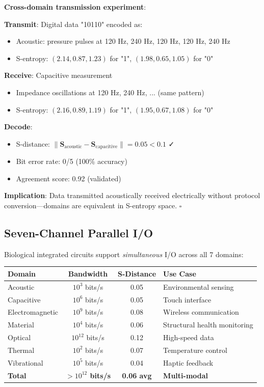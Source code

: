 \documentclass[11pt,a4paper]{article}
\begin{document}
\textbf{Cross-domain transmission experiment}:

\textbf{Transmit}: Digital data "10110" encoded as:
\begin{itemize}
\item Acoustic: pressure pulses at 120 Hz, 240 Hz, 120 Hz, 120 Hz, 240 Hz
\item S-entropy: $(2.14, 0.87, 1.23)$ for "1", $(1.98, 0.65, 1.05)$ for "0"
\end{itemize}

\textbf{Receive}: Capacitive measurement
\begin{itemize}
\item Impedance oscillations at 120 Hz, 240 Hz, ... (same pattern)
\item S-entropy: $(2.16, 0.89, 1.19)$ for "1", $(1.95, 0.67, 1.08)$ for "0"
\end{itemize}

\textbf{Decode}:
\begin{itemize}
\item S-distance: $\|\mathbf{S}_{\text{acoustic}} - \mathbf{S}_{\text{capacitive}}\| = 0.05 < 0.1$ ✓
\item Bit error rate: 0/5 (100\% accuracy)
\item Agreement score: 0.92 (validated)
\end{itemize}

\textbf{Implication}: Data transmitted acoustically received electrically without protocol conversion—domains are equivalent in S-entropy space. $\square$

\subsection{Seven-Channel Parallel I/O}

Biological integrated circuits support \textit{simultaneous} I/O across all 7 domains:

\begin{center}
\begin{tabular}{lccl}
\toprule
\textbf{Domain} & \textbf{Bandwidth} & \textbf{S-Distance} & \textbf{Use Case} \\
\midrule
Acoustic & $10^3$ bits/s & 0.05 & Environmental sensing \\
Capacitive & $10^6$ bits/s & 0.05 & Touch interface \\
Electromagnetic & $10^9$ bits/s & 0.08 & Wireless communication \\
Material & $10^4$ bits/s & 0.06 & Structural health monitoring \\
Optical & $10^{12}$ bits/s & 0.12 & High-speed data \\
Thermal & $10^2$ bits/s & 0.07 & Temperature control \\
Vibrational & $10^5$ bits/s & 0.04 & Haptic feedback \\
\midrule
\textbf{Total} & \textbf{$>10^{12}$ bits/s} & \textbf{0.06 avg} & \textbf{Multi-modal} \\
\bottomrule
\end{tabular}
\end{center}
\end{document}
